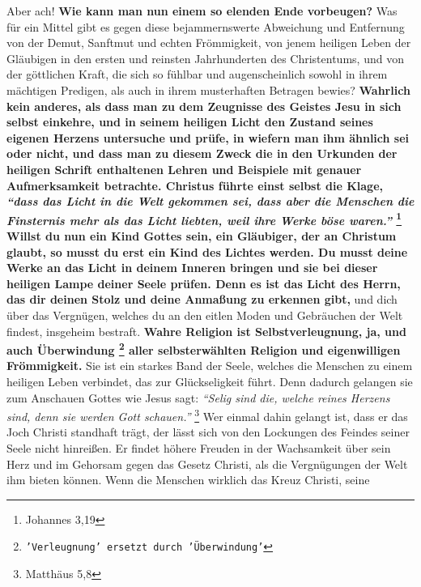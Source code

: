 Aber ach! \textbf{Wie kann man nun einem so elenden Ende vorbeugen?} Was für ein
Mittel
gibt es gegen diese bejammernswerte Abweichung und Entfernung von der Demut,
Sanftmut und echten Frömmigkeit, von jenem heiligen Leben der Gläubigen in den
ersten und reinsten Jahrhunderten des Christentums, und von der göttlichen
Kraft, die sich so fühlbar und augenscheinlich sowohl in ihrem mächtigen
Predigen, als auch in ihrem musterhaften Betragen bewies? \textbf{Wahrlich kein
anderes,
als dass man zu dem Zeugnisse des Geistes Jesu in sich
selbst einkehre, und in
seinem heiligen Licht den Zustand seines eigenen Herzens untersuche und prüfe,
in wiefern man ihm ähnlich sei oder nicht, und dass man zu diesem Zweck die in
den Urkunden der heiligen Schrift enthaltenen Lehren und
Beispiele mit genauer
Aufmerksamkeit betrachte. Christus führte einst selbst die Klage,
\textit{"`dass das
Licht in die Welt gekommen sei, dass aber die Menschen die Finsternis mehr als
das Licht liebten, weil ihre Werke böse waren."'}
\footnote{Johannes 3,19}
Willst du
nun ein Kind Gottes sein, ein Gläubiger, der an Christum
glaubt, so musst du erst
ein Kind des Lichtes werden. Du musst deine Werke an das
Licht in deinem Inneren
bringen und sie bei dieser heiligen Lampe deiner Seele prüfen. Denn es ist das
Licht des Herrn, das dir deinen Stolz und deine Anmaßung zu erkennen gibt,}
und
dich über das Vergnügen, welches du an den eitlen Moden und
Gebräuchen der Welt
findest, insgeheim bestraft. \textbf{Wahre Religion ist Selbstverleugnung, ja,
und auch Überwindung
\footnote{\texttt{'Verleugnung' ersetzt durch 'Überwindung'}}
aller selbsterwählten Religion und eigenwilligen Frömmigkeit.} Sie
ist ein starkes Band der Seele, welches die Menschen zu einem heiligen Leben
verbindet, das zur Glückseligkeit führt. Denn dadurch gelangen sie zum Anschauen
Gottes wie Jesus sagt:
\textit{"`Selig sind die, welche reines Herzens sind, denn sie
werden Gott schauen."'}
\footnote{Matthäus 5,8}
Wer einmal dahin gelangt ist, dass
er das Joch Christi standhaft trägt, der lässt sich von den Lockungen des Feindes
seiner Seele nicht hinreißen. Er findet höhere Freuden in der Wachsamkeit über
sein Herz und im Gehorsam gegen das Gesetz Christi, als die Vergnügungen der
Welt ihm bieten können. Wenn die Menschen wirklich das Kreuz Christi, seine
